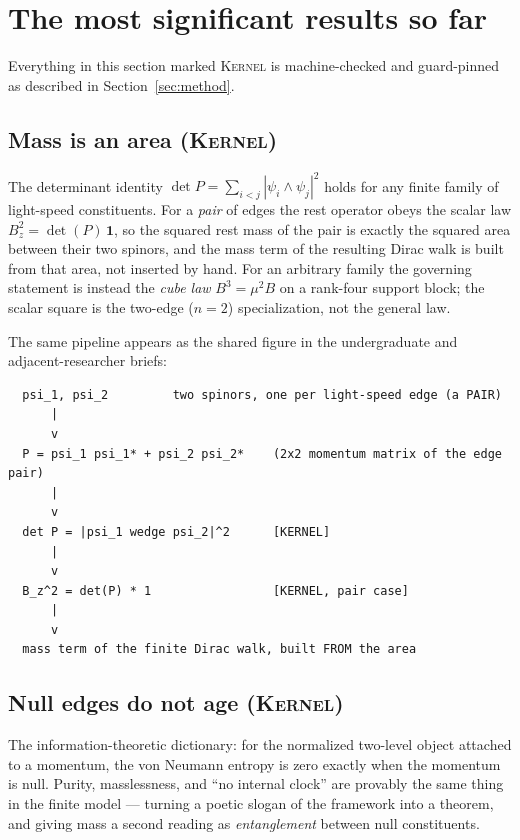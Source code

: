 \documentclass[11pt]{article}
\newcommand{\Kernel}{\textcolor{kernelcolor}{\textsc{Kernel}}}
\begin{document}
\section{The most significant results so far}\label{sec:results}

Everything in this section marked \Kernel{} is machine-checked and
guard-pinned as described in Section~\ref{sec:method}.

\subsection{Mass is an area (\Kernel)}

The determinant identity $\det P=\sum_{i<j}|\psi_i\wedge\psi_j|^2$ holds for
any finite family of light-speed constituents.  For a \emph{pair} of edges
the rest operator obeys the scalar law $B_z^2=\det(P)\,\mathbf 1$, so the
squared rest mass of the pair is exactly the squared area between their two
spinors, and the mass term of the resulting Dirac walk is built from that
area, not inserted by hand.  For an arbitrary family the governing statement
is instead the \emph{cube law} $B^3=\mu^2 B$ on a rank-four support block;
the scalar square is the two-edge ($n=2$) specialization, not the general
law.

The same pipeline appears as the shared figure in the undergraduate and
adjacent-researcher briefs:

\begin{verbatim}
  psi_1, psi_2         two spinors, one per light-speed edge (a PAIR)
      |
      v
  P = psi_1 psi_1* + psi_2 psi_2*    (2x2 momentum matrix of the edge pair)
      |
      v
  det P = |psi_1 wedge psi_2|^2      [KERNEL]
      |
      v
  B_z^2 = det(P) * 1                 [KERNEL, pair case]
      |
      v
  mass term of the finite Dirac walk, built FROM the area
\end{verbatim}

\subsection{Null edges do not age (\Kernel)}

The information-theoretic dictionary: for the normalized two-level object
attached to a momentum, the von Neumann entropy is zero exactly when the
momentum is null.  Purity, masslessness, and ``no internal clock'' are
provably the same thing in the finite model --- turning a poetic slogan of
the framework into a theorem, and giving mass a second reading as
\emph{entanglement} between null constituents.
\end{document}
